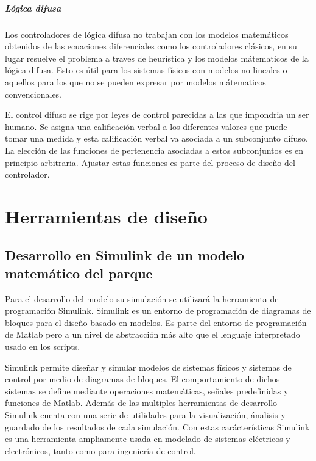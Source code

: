 \documentclass{book}
\begin{document}
		\paragraph{L\'ogica difusa}

Los controladores de l\'ogica difusa no trabajan con los modelos matem\'aticos obtenidos de las ecuaciones diferenciales como los controladores cl\'asicos, en su lugar resuelve el problema a traves de heur\'istica y los modelos m\'atematicos de la l\'ogica difusa. Esto es \'util para los sistemas f\'isicos con modelos no lineales o aquellos para los que no se pueden expresar por modelos m\'atematicos convencionales. \par

El control difuso se rige por leyes de control parecidas a las que impondria un ser humano. Se asigna una calificaci\'on verbal a los diferentes valores que puede tomar una medida y esta calificaci\'on verbal va asociada a un subconjunto difuso. La elecci\'on de las funciones de pertenencia asociadas a estos subconjuntos es en principio arbitraria. Ajustar estas funciones es parte del proceso de diseño del controlador. \par


\chapter{Herramientas de diseño}


	\section{Desarrollo en Simulink de un modelo matem\'atico del parque}

Para el desarrollo del modelo su simulaci\'on se utilizar\'a la herramienta de programaci\'on Simulink. Simulink es un entorno de programaci\'on de diagramas de bloques para el diseño basado en modelos. Es parte del entorno de programaci\'on de Matlab pero a un nivel de abstracci\'on m\'as alto que el lenguaje interpretado usado en los scripts. \par

Simulink permite diseñar y simular modelos de sistemas f\'isicos y sistemas de control por medio de diagramas de bloques. El comportamiento de dichos sistemas se define mediante operaciones matem\'aticas, señales predefinidas y funciones de Matlab. Adem\'as de las multiples herramientas de desarrollo Simulink cuenta con una serie de utilidades para la visualizaci\'on, \'analisis y guardado de los resultados de cada simulaci\'on. Con estas car\'acter\'isticas Simulink es una herramienta ampliamente usada en modelado de sistemas el\'ectricos y electr\'onicos, tanto como para ingenier\'ia de control. \par
\end{document}
